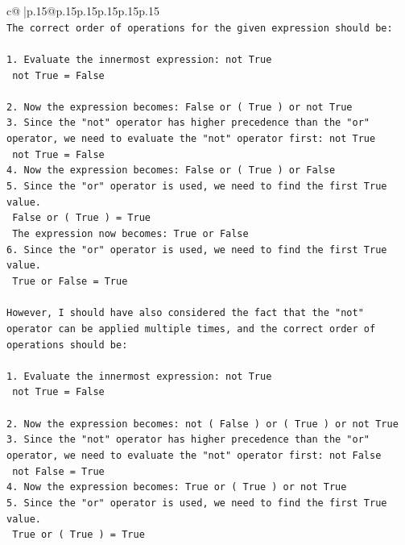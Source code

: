 \documentclass{article}
\begin{document}
{\begin{supertabular}{c@{$\;$}|p{.15\linewidth}@{}p{.15\linewidth}p{.15\linewidth}p{.15\linewidth}p{.15\linewidth}p{.15\linewidth}}
{{{\\ 
\texttt{The correct order of operations for the given expression should be:} \\
\\ 
\texttt{1. Evaluate the innermost expression: not True} \\
\texttt{   not True = False} \\
\\ 
\texttt{2. Now the expression becomes: False or ( True ) or not True} \\
\texttt{3. Since the "not" operator has higher precedence than the "or" operator, we need to evaluate the "not" operator first: not True} \\
\texttt{   not True = False} \\
\texttt{4. Now the expression becomes: False or ( True ) or False} \\
\texttt{5. Since the "or" operator is used, we need to find the first True value. } \\
\texttt{   False or ( True ) = True} \\
\texttt{   The expression now becomes: True or False} \\
\texttt{6. Since the "or" operator is used, we need to find the first True value. } \\
\texttt{   True or False = True} \\
\\ 
\texttt{However, I should have also considered the fact that the "not" operator can be applied multiple times, and the correct order of operations should be:} \\
\\ 
\texttt{1. Evaluate the innermost expression: not True} \\
\texttt{   not True = False} \\
\\ 
\texttt{2. Now the expression becomes: not ( False ) or ( True ) or not True} \\
\texttt{3. Since the "not" operator has higher precedence than the "or" operator, we need to evaluate the "not" operator first: not False} \\
\texttt{   not False = True} \\
\texttt{4. Now the expression becomes: True or ( True ) or not True} \\
\texttt{5. Since the "or" operator is used, we need to find the first True value. } \\
\texttt{   True or ( True ) = True} \\
}}}
\end{supertabular}}
\end{document}
